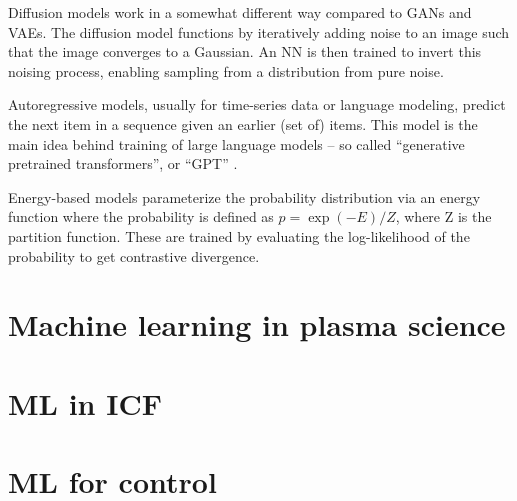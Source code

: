 Diffusion models \cite{ho_denoising_2020} work in a somewhat different way compared to GANs and VAEs. The diffusion model functions by iteratively adding noise to an image such that the image converges to a Gaussian. An NN is then trained to invert this noising process, enabling sampling from a distribution from pure noise. 

Autoregressive models, usually for time-series data or language modeling, predict the next item in a sequence given an earlier (set of) items. This model is the main idea behind training of large language models -- so called ``generative pretrained transformers'', or ``GPT'' \cite{radford_improving_2018}. 

Energy-based models parameterize the probability distribution via an energy function where the probability is defined as $p =\exp(-E) / Z$, where Z is the partition function. These are trained by evaluating the log-likelihood of the probability to get contrastive divergence. 

\section{Machine learning in plasma science}

\section{ML in ICF}

\section{ML for control}




























